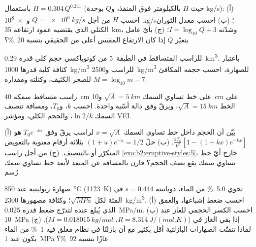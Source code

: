 \begin{exercise}[$\star$]\label{exo:b2:eruptive-styles:3}
باستعمال $H = 0.304\,Q^{0.241}$ (حيث $H$ بالكيلومتر فوق المنفذ، و$Q$ بوحدة
\unit{kg/s}): (أ) احسب $H$ من أجل $Q = \qty{e6}{kg/s}$ و\qty{e8}{kg/s}؛
(ب) احسب معدل الثوران الكتلي الذي يقتضيه عمود ارتفاعه \qty{35}{km}،
وشدّته $I = \log_{10}Q + 3$؛ (ج) بأيّ عامل يتغيّر $Q$ إذا كان الارتفاع المقيس
أعلى من الحقيقي بنسبة \qty{20}{\percent}؟
\end{exercise}

\begin{exercise}[$\star$]\label{exo:b2:eruptive-styles:4}
للراسب المتساقط في الطبقة~5 من كوتوباكسي حجم كلي قدره \qty{0.29}{km^3}. باعتبار
كثافة كلية قدرها \qty{1000}{kg/m^3} للراسب و\qty{2500}{kg/m^3}
للصهارة، احسب حجمه المكافئ للصخر الكثيف، وكتلته ومقداره
$M = \log_{10}m - 7$.
\end{exercise}

\begin{exercise}[$\star\star$]\label{exo:b2:eruptive-styles:5}
راسب متساقط سمكه \qty{40}{cm} على خط تساوي السمك $\sqrt A = \qty{5}{km}$
و\qty{10}{cm} على الخط $\sqrt A = \qty{15}{km}$، ويرقّ وفق دالة
أسّية واحدة. احسب $k$، و$T_0$، ومسافة تنصيف السمك $\ln 2/k$، والحجم
الكلي، ومؤشر VEI.
\end{exercise}

\begin{exercise}[$\star\star$]\label{exo:b2:eruptive-styles:6}
(أ) بيّن أن الحجم داخل خط تساوي السمك $x = \sqrt A$ لراسب يرقّ
وفق $T_0e^{-kx}$ هو $\frac{2T_0}{k^2}[1 - (1 + kx)e^{-kx}]$. (ب) حلّ $(1 + u)e^{-u} =
1/2$ بثلاثة أرقام معنوية بالتعويض المتكرّر أو بالتنصيف. (ج) من أجل
راسب \cref{exo:b2:eruptive-styles:5}، خارج أيّ خط تساوي سمك يقع نصف الحجم؟ قارن
بالمسافة عن المنفذ لأبعد خط تساوي سمك رُسم.
\end{exercise}

\begin{exercise}[$\star\star$]\label{exo:b2:eruptive-styles:7}
صهارة ريوليتية عند \qty{850}{\celsius} (\qty{1123}{K}) تحوي
\qty{5.0}{\percent} من الماء، ذوبانيته $s = 0.444$ في المئة لكل
$\sqrt{\unit{MPa}}$؛ وكثافة مصهورها \qty{2300}{kg/m^3}. (أ) احسب
ضغط إشباعها، والعمق الذي يُبلغ عنده لتدرّج ضغط
قدره \qty{0.025}{MPa/m}. (ب) احسب الكسر الحجمي للغاز عند
\qty{10}{MPa} إذا بقي الغاز في  ($R = \qty{8.314}{J/(mol.K)}$، $M =
\qty{0.018015}{kg/mol}$). (ج) لماذا تتفتّت الصهارات البازلتية أقل بكثير
مع أن بازلتًا في نظام مغلق فيه \qty{1}{\percent} من
الماء يكون عند \qty{1}{MPa} غازًا بنسبة \qty{92}{\percent}؟
\end{exercise}


